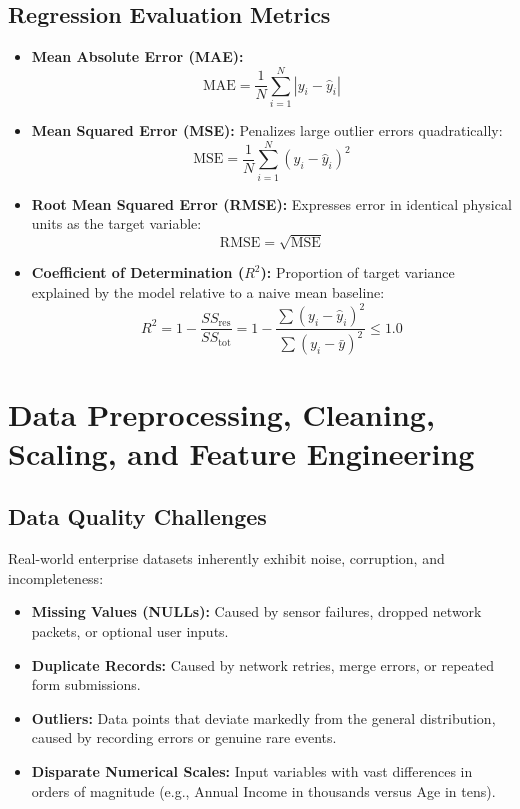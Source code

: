 \subsection{Regression Evaluation Metrics}
\begin{itemize}
    \item \textbf{Mean Absolute Error (MAE):}
    \begin{equation}
    \text{MAE} = \frac{1}{N} \sum_{i=1}^N |y_i - \hat{y}_i|
    \end{equation}
    \item \textbf{Mean Squared Error (MSE):} Penalizes large outlier errors quadratically:
    \begin{equation}
    \text{MSE} = \frac{1}{N} \sum_{i=1}^N (y_i - \hat{y}_i)^2
    \end{equation}
    \item \textbf{Root Mean Squared Error (RMSE):} Expresses error in identical physical units as the target variable:
    \begin{equation}
    \text{RMSE} = \sqrt{\text{MSE}}
    \end{equation}
    \item \textbf{Coefficient of Determination ($R^2$):} Proportion of target variance explained by the model relative to a naive mean baseline:
    \begin{equation}
    R^2 = 1 - \frac{SS_{\text{res}}}{SS_{\text{tot}}} = 1 - \frac{\sum (y_i - \hat{y}_i)^2}{\sum (y_i - \bar{y})^2} \le 1.0
    \end{equation}
\end{itemize}



\section{Data Preprocessing, Cleaning, Scaling, and Feature Engineering}
\label{sec:data_preprocessing}

\subsection{Data Quality Challenges}
Real-world enterprise datasets inherently exhibit noise, corruption, and incompleteness:
\begin{itemize}
    \item \textbf{Missing Values (NULLs):} Caused by sensor failures, dropped network packets, or optional user inputs.
    \item \textbf{Duplicate Records:} Caused by network retries, merge errors, or repeated form submissions.
    \item \textbf{Outliers:} Data points that deviate markedly from the general distribution, caused by recording errors or genuine rare events.
    \item \textbf{Disparate Numerical Scales:} Input variables with vast differences in orders of magnitude (e.g., Annual Income in thousands versus Age in tens).
\end{itemize}

